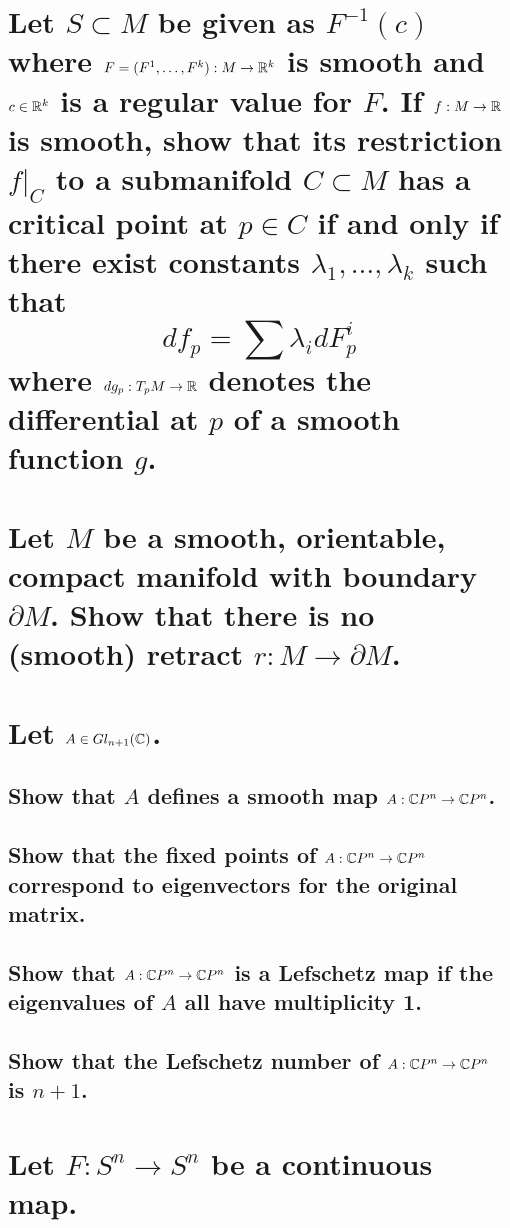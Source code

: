 \documentclass[10pt]{article}
\begin{document}
\section{Let $S \subset M$ be given as $F^{-1} (c)$ where $F = (F^1 , \dots, F^k) : M \to
  \mathbb{R}^k$ is smooth and $c \in \mathbb{R}^k$ is a regular value for $F$. If $f: M \to
  \mathbb{R}$ is smooth, show that its restriction $f|_C$ to a submanifold $C \subset M$ has a
  critical point at $p \in C$ if and only if there exist constants $\lambda_1, \dots, \lambda_k$
  such that
  $$df_p = \sum \lambda_i dF_p^i$$
  where $dg_p : T_p M \to \mathbb{R}$ denotes the differential at $p$ of a smooth function $g$.}

\section{Let $M$ be a smooth, orientable, compact manifold with boundary $\partial M$. Show that
  there is no (smooth) retract $r: M \to \partial M$. }

\section{Let $A \in Gl_{n+1}(\mathbb{C})$.}

\subsection{Show that $A$ defines a smooth map $A: \mathbb{C}P^{n} \to \mathbb{C}P^{n}$.}

\subsection{Show that the fixed points of $A: \mathbb{C}P^{n} \to \mathbb{C}P^{n}$ correspond to eigenvectors for the
  original matrix.}

\subsection{Show that $A : \mathbb{C}P^{n} \to \mathbb{C}P^{n}$ is a Lefschetz map if the eigenvalues of $A$ all have
  multiplicity 1.}

\subsection{Show that the Lefschetz number of $A: \mathbb{C}P^{n} \to \mathbb{C}P^{n}$ is $n+1$. }

\section{Let $F: S^n \to S^n$ be a continuous map.}
\end{document}
